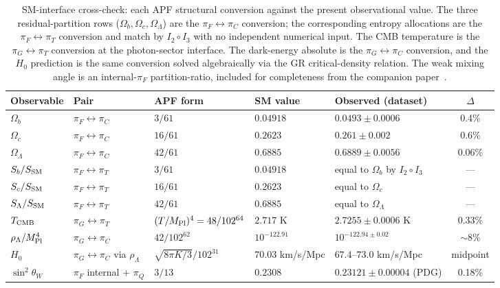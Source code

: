\documentclass[11pt]{article}
\newcommand{\Mpl}{M_{\rm Pl}}
\begin{document}
\begin{table}[h]
\centering
\footnotesize
\setlength{\tabcolsep}{4pt}
\begin{tabularx}{\textwidth}{@{}l l l l X c@{}}
\toprule
\textbf{Observable} & \textbf{Pair} & \textbf{APF form} & \textbf{SM value} & \textbf{Observed (dataset)} & $\Delta$ \\
\midrule
$\Omega_b$           & $\pi_F \leftrightarrow \pi_C$ & $3/61$   & $0.04918$           & $0.0493 \pm 0.0006$ \cite{Planck2018}  & 0.4\% \\
$\Omega_c$           & $\pi_F \leftrightarrow \pi_C$ & $16/61$  & $0.2623$            & $0.261 \pm 0.002$ \cite{Planck2018}    & 0.6\% \\
$\Omega_\Lambda$     & $\pi_F \leftrightarrow \pi_C$ & $42/61$  & $0.6885$            & $0.6889 \pm 0.0056$ \cite{Planck2018}  & 0.06\% \\
\addlinespace[2pt]
$S_b / S_{\rm SM}$   & $\pi_F \leftrightarrow \pi_T$ & $3/61$   & $0.04918$           & equal to $\Omega_b$ by $I_2 \circ I_3$ & ---   \\
$S_c / S_{\rm SM}$   & $\pi_F \leftrightarrow \pi_T$ & $16/61$  & $0.2623$            & equal to $\Omega_c$                    & ---   \\
$S_\Lambda / S_{\rm SM}$ & $\pi_F \leftrightarrow \pi_T$ & $42/61$ & $0.6885$         & equal to $\Omega_\Lambda$              & ---   \\
\addlinespace[2pt]
$T_{\rm CMB}$        & $\pi_G \leftrightarrow \pi_T$ & $(T/\Mpl)^4 = 48/102^{64}$ & $2.717$ K & $2.7255 \pm 0.0006$ K \cite{Fixsen2009} & 0.33\% \\
\addlinespace[2pt]
$\rho_\Lambda / \Mpl^4$ & $\pi_G \leftrightarrow \pi_C$ & $42/102^{62}$ & $10^{-122.91}$ & $10^{-122.94 \pm 0.02}$ \cite{Planck2018,Riess2022} & $\sim 8\%$ \\
\addlinespace[2pt]
$H_0$                & $\pi_G \leftrightarrow \pi_C$ via $\rho_\Lambda$ & $\sqrt{8\pi K/3}/102^{31}$ & $70.03$ km/s/Mpc & $67.4$--$73.0$ km/s/Mpc \cite{Planck2018,Riess2022} & midpoint \\
\addlinespace[2pt]
$\sin^2\theta_W$     & $\pi_F$ internal + $\pi_Q$ & $3/13$ & $0.2308$ & $0.23121 \pm 0.00004$ (PDG) \cite{PDG2024} & 0.18\% \\
\bottomrule
\end{tabularx}
\caption{SM-interface cross-check: each APF structural conversion against the present observational value. The three residual-partition rows ($\Omega_b, \Omega_c, \Omega_\Lambda$) are the $\pi_F \leftrightarrow \pi_C$ conversion; the corresponding entropy allocations are the $\pi_F \leftrightarrow \pi_T$ conversion and match by $I_2 \circ I_3$ with no independent numerical input. The CMB temperature is the $\pi_G \leftrightarrow \pi_T$ conversion at the photon-sector interface. The dark-energy absolute is the $\pi_G \leftrightarrow \pi_C$ conversion, and the $H_0$ prediction is the same conversion solved algebraically via the GR critical-density relation. The weak mixing angle is an internal-$\pi_F$ partition-ratio, included for completeness from the companion paper~\cite{BrookeWeakMixing}.}\label{tab:conversion_crosscheck}
\end{table}
\end{document}
